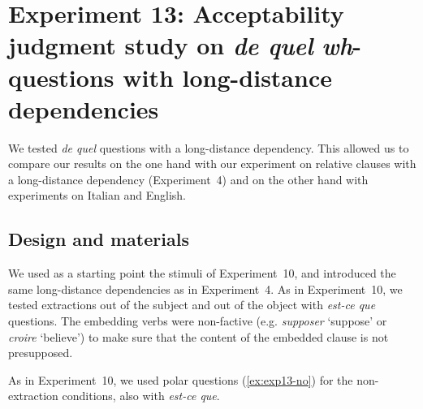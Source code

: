 \section[head=Experiment 13]{Experiment 13: Acceptability judgment study on \emph{de quel} \emph{wh}-questions with long-distance dependencies}

We tested \emph{de quel} questions with a long-distance dependency. This allowed us to compare our results on the one hand with our experiment on relative clauses with a long-distance dependency (Experiment~4) and on the other hand with  experiments on Italian and English.

\subsection{Design and materials}

We used as a starting point the stimuli of Experiment~10, and introduced the same long-distance dependencies as in Experiment~4. As in Experiment~10, we tested extractions out of the subject and out of the object with \emph{est-ce que} questions. The embedding verbs were non-factive (e.g. \emph{supposer} `suppose' or \emph{croire} `believe') to make sure that the content of the embedded clause is not presupposed. 

\eal 
{}
\label{ex:exp13-subj-pp}
\label{ex:exp13-obj-pp}
\zl 

As in Experiment~10, we used polar questions (\ref{ex:exp13-no}) for the non-extraction conditions, also with \emph{est-ce que}. 


